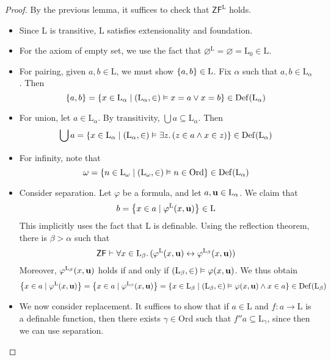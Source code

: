 \begin{proof}
    By the previous lemma, it suffices to check that \( \mathsf{ZF}^{\mathrm{L}} \) holds.
    \begin{itemize}
        \item Since \( \mathrm{L} \) is transitive, \( \mathrm{L} \) satisfies extensionality and foundation.
        \item For the axiom of empty set, we use the fact that \( \varnothing^{\mathrm{L}} = \varnothing = \mathrm{L}_0 \in \mathrm{L} \).
        \item For pairing, given \( a, b \in \mathrm{L} \), we must show \( \qty{a, b} \in \mathrm{L} \).
        Fix \( \alpha \) such that \( a, b \in \mathrm{L}_\alpha \).
        Then
        \[ \qty{a, b} = \qty{x \in \mathrm{L}_\alpha \mid (\mathrm{L}_\alpha, \in) \vDash x = a \vee x = b} \in \operatorname{Def}(\mathrm{L}_\alpha) \]
        \item For union, let \( a \in \mathrm{L}_\alpha \).
        By transitivity, \( \bigcup a \subseteq \mathrm{L}_\alpha \).
        Then
        \[ \bigcup a = \qty{x \in \mathrm{L}_\alpha \mid (\mathrm{L}_\alpha, \in) \vDash \exists z.\, (z \in a \wedge x \in z)} \in \operatorname{Def}(\mathrm{L}_\alpha) \]
        \item For infinity, note that
        \[ \omega = \qty{n \in \mathrm{L}_\omega \mid (\mathrm{L}_\omega, \in) \vDash n \in \mathrm{Ord}} \in \operatorname{Def}(\mathrm{L}_\alpha) \]
        \item Consider separation.
        Let \( \varphi \) be a formula, and let \( a, \vb u \in \mathrm{L}_\alpha \).
        We claim that
        \[ b = \qty{x \in a \mid \varphi^{\mathrm{L}}(x, \vb u)} \in \mathrm{L} \]
        This implicitly uses the fact that \( \mathrm{L} \) is definable.
        Using the reflection theorem, there is \( \beta > \alpha \) such that
        \[ \mathsf{ZF} \vdash \forall x \in \mathrm{L}_\beta.\, (\varphi^{\mathrm{L}}(x, \vb u) \leftrightarrow \varphi^{\mathrm{L}_\beta}(x, \vb u)) \]
        Moreover, \( \varphi^{\mathrm{L}_\beta}(x, \vb u) \) holds if and only if \( (\mathrm{L}_\beta, \in) \vDash \varphi(x, \vb u) \).
        We thus obtain
        \[ \qty{x \in a \mid \varphi^{\mathrm{L}}(x, \vb u)} = \qty{x \in a \mid \varphi^{\mathrm{L}_\beta}(x, \vb u)} = \qty{x \in \mathrm{L}_\beta \mid (\mathrm{L}_\beta, \in) \vDash \varphi(x, \vb u) \wedge x \in a} \in \operatorname{Def}(\mathrm{L}_\beta) \]
        \item We now consider replacement.
        It suffices to show that if \( a \in \mathrm{L} \) and \( f : a \to \mathrm{L} \) is a definable function, then there exists \( \gamma \in \mathrm{Ord} \) such that \( f '' a \subseteq \mathrm{L}_\gamma \), since then we can use separation.

\end{itemize}
\end{proof}
